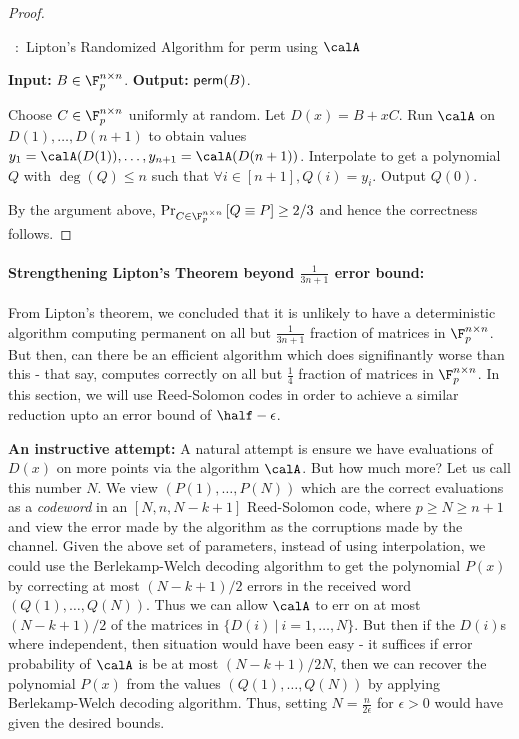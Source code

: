 \begin{proof}
\begin{algorithm}
\label{alg:rand-algo-perm1}
\caption{~:~Lipton's Randomized Algorithm for {\sf perm} using $\calA$}
{\bf Input:} $B \in \F_p^{n \times n}$.
{\bf Output: } ${\sf perm}(B)$.
\begin{algorithmic}[1]
\State Choose $C \in  \F_p^{n \times n}$ uniformly at random.
\State Let $D(x)= B+xC$.
\State Run $\calA$ on $D(1), \ldots, D(n+1)$ to obtain values $y_1= \calA(D(1)), \ldots, y_{n+1}=\calA(D(n+1))$.
\State Interpolate to get a polynomial $Q$ with $\deg(Q) \le n$ such that $\forall i \in [n+1], Q(i)=y_i$.
\State Output $Q(0)$.\end{algorithmic}
\end{algorithm}

By the argument above, 
$\Pr_{C \in \F_p^{n \times n}}\left[ Q\equiv P \right] \ge 2/3$
and hence the correctness follows.
\end{proof}

\paragraph{Strengthening Lipton's Theorem beyond $\frac{1}{3n+1}$ error bound:}
From Lipton's theorem, we concluded that it is unlikely to have a deterministic algorithm computing permanent on all but $\frac{1}{3n+1}$ fraction of matrices in $\F_p^{n \times n}$. But then, can there be an efficient algorithm which does signifinantly worse than this - that say, computes correctly on all but $\frac{1}{4}$ fraction of matrices in $\F_p^{n \times n}$. In this section, we will use Reed-Solomon codes in order to achieve a similar reduction upto an error bound of $\half-\epsilon$.

\noindent \textbf{An instructive attempt:} A natural attempt is ensure we have evaluations of $D(x)$ on more points via the algorithm $\calA$. But how much more? Let us call this number $N$. We view $(P(1), \ldots, P(N))$ which are the correct evaluations as a \textit{codeword} in an $[N,n,N-k+1]$ Reed-Solomon code, where $p \ge N \ge n+1$ and view the error made by the algorithm as the corruptions made by the channel. Given the above set of parameters, instead of using interpolation, we could use the Berlekamp-Welch decoding algorithm to get the polynomial $P(x)$ by correcting at most $(N-k+1)/2$ errors in the received word $(Q(1), \ldots, Q(N))$. Thus we can allow $\calA$ to err on at most $(N-k+1)/2$ of the matrices in $\{D(i)~|~i=1,\ldots, N\}$. But then if the $D(i)$s where independent, then situation would have been easy - it suffices if error probability of $\calA$ is be at most  $(N-k+1)/2N$, then we can recover the polynomial $P(x)$ from the values $(Q(1), \ldots, Q(N))$ by applying Berlekamp-Welch decoding algorithm. Thus, setting $N= \frac{n}{2\epsilon}$ for $\epsilon>0$ would have given the desired bounds. 

